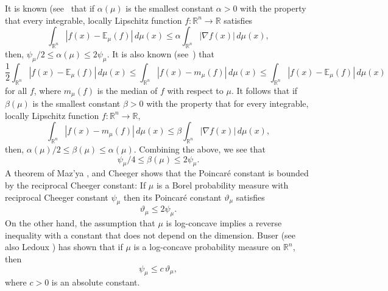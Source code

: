 \documentclass[11pt,leqno]{article}
\theoremstyle{definition}
\theoremstyle{remark}
\numberwithin{equation}{section}
\newcommand{\ls}{\leqslant}
\newcommand{\1}{\textbf{1}}
\begin{document}
It is known (see~\cite[Theorem~2.3.1]{AGA-book-2} that if $\alpha(\mu)$ is the smallest constant $\alpha>0$ with the property
that every integrable, locally Lipschitz function $f:{\mathbb R}^n\to {\mathbb R}$ satisfies
\begin{equation}\label{eq:cheeger-poincare-1-1}\int_{{\mathbb R}^n} |f(x)-{\mathbb E}_{\mu }(f)|\,d\mu (x)\ls
\alpha\int_{{\mathbb R}^n} |\nabla f (x)|\,d\mu (x),\end{equation}
then, $\psi_{\mu}/2\ls \alpha(\mu)\ls 2\psi_{\mu}$. It is also known (see~\cite{Cattiaux-Guillin-2020}) that
$$\frac{1}{2}\int_{\mathbb{R}^n}|f(x)-\mathbb{E}_{\mu}(f)|\,d\mu(x)\ls \int_{\mathbb{R}^n}|f(x)-m_{\mu}(f)|\,d\mu(x)\ls 
\int_{\mathbb{R}^n}|f(x)-\mathbb{E}_{\mu}(f)|\,d\mu(x)$$
for all $f$, where $m_{\mu}(f)$ is the median of $f$ with respect to $\mu$. It follows that if
$\beta(\mu)$ is the smallest constant $\beta>0$ with the property
that for every integrable, locally Lipschitz function $f:{\mathbb R}^n\to {\mathbb R}$,
\begin{equation}\label{eq:cheeger-poincare-1-2}\int_{{\mathbb R}^n} |f(x)-m_{\mu }(f)|\,d\mu (x)\ls
\beta\int_{{\mathbb R}^n} |\nabla f (x)|\,d\mu (x),\end{equation}
then, $\alpha(\mu)/2\ls \beta(\mu)\ls \alpha(\mu)$. Combining the above, we see that
\begin{equation}\label{eq:cheeger-poincare-1-3}\psi_{\mu}/4\ls \beta(\mu)\ls 2\psi_{\mu}.\end{equation}
A theorem of Maz'ya \cite{Mazya-1960}, \cite{Mazya-1962} and Cheeger \cite{Cheeger-1970}
shows that the Poincar\'{e} constant is bounded by the reciprocal Cheeger constant: If $\mu$ is a Borel probability measure with 
reciprocal Cheeger constant $\psi_\mu$ then its Poincar\'e constant $\vartheta_{\mu}$ satisfies
\begin{equation}\label{eq:cheeger-poincare-1}\vartheta_{\mu}\ls 2\psi_{\mu }.\end{equation}
On the other hand, the assumption that $\mu$ is log-concave implies a reverse inequality with a constant that
does not depend on the dimension. Buser \cite{Buser-1982} (see also Ledoux \cite{Ledoux-1994})
has shown that if $\mu$ is a log-concave probability measure on $\mathbb{R}^n$, then 
\begin{equation}\label{eq:cheeger-poincare-2}\psi_{\mu }\ls c\,\vartheta_{\mu},\end{equation}
where $c>0$ is an absolute constant.
\end{document}
